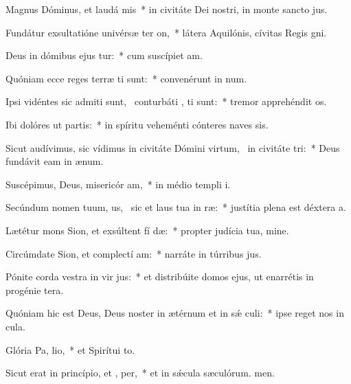 \item Magnus Dóminus, et laudá mis~* in civitáte Dei nostri, in monte sancto jus.
\item Fundátur exsultatióne univérsæ ter  on,~* látera Aquilónis, cívitas Regis gni.
\item Deus in dómibus ejus tur:~* cum suscípiet am.
\item Quóniam ecce reges terræ ti sunt:~* convenérunt in num.
\item Ipsi vidéntes sic admiti sunt,~\pscross{} conturbáti , ti sunt:~* tremor apprehéndit os.
\item Ibi dolóres ut partis:~* in spíritu veheménti cónteres naves sis.
\item Sicut audívimus, sic vídimus in civitáte Dómini virtum,~\pscross{} in civitáte  tri:~* Deus fundávit eam in ænum.
\item Suscépimus, Deus, misericór am,~* in médio templi i.
\item Secúndum nomen tuum, us,~\pscross{} sic et laus tua in  ræ:~* justítia plena est déxtera a.
\item Lætétur mons Sion, et exsúltent fí dæ:~* propter judícia tua, mine.
\item Circúmdate Sion, et complectí am:~* narráte in túrribus jus.
\item Pónite corda vestra in vir jus:~* et distribúite domos ejus, ut enarrétis in progénie tera.
\item Quóniam hic est Deus, Deus noster in ætérnum et in sǽ culi:~* ipse reget nos in cula.
\item Glória Pa,  lio,~* et Spirítui to.
\item Sicut erat in princípio, et ,  per,~* et in sǽcula sæculórum. men.
